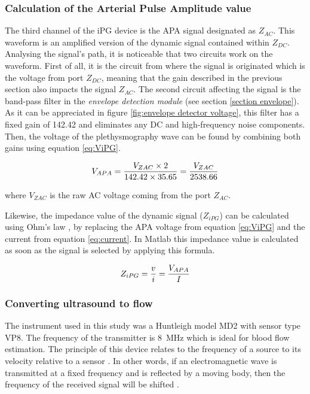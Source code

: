 \subsubsection{Calculation of the Arterial Pulse Amplitude value}
The third channel of the iPG device is the APA signal designated as $Z_{AC}$. This waveform is an amplified version of the dynamic signal contained within $Z_{DC}$. Analysing the signal's path, it is noticeable that two circuits work on the waveform. First of all, it is the circuit from where the signal is originated which is the voltage from port $Z_{DC}$, meaning that the gain described in the previous section also impacts the signal $Z_{AC}$. The second circuit affecting the signal is the band-pass filter in the \textit{envelope detection module} (see section \ref{section envelope}). As it can be appreciated in figure \ref{fig:envelope detector voltage}, this filter has a fixed gain of \num{142.42} and eliminates any DC and high-frequency noise components. Then, the voltage of the plethysmography wave can be found by combining both gains using equation \ref{eq:ViPG}.

\begin{align}
	\label{eq:ViPG}
	V_{APA} = \frac{V_{ZAC} \times 2}{142.42 \times 35.65}=\frac{V_{ZAC}}{2538.66} \tagaddtext{[\si{\volt}]}
\end{align}

where $V_{ZAC}$ is the raw AC voltage coming from the port $Z_{AC}$.

Likewise, the impedance value of the dynamic signal ($Z_{iPG}$) can be calculated using Ohm's law \cite{ohm1827galvanische}, by replacing the APA voltage from equation \ref{eq:ViPG} and the current from equation \ref{eq:current}. In Matlab this impedance value is calculated as soon as the signal is selected by applying this formula.

\begin{align}
	\label{eq:zipg}
	Z_{iPG}=\frac{v}{i} = \frac{V_{APA}}{I} \tagaddtext{[\si{\ohm}]}
\end{align}

\subsubsection{Converting ultrasound to flow}
\label{sectionDU}
The instrument used in this study was a Huntleigh model MD2 with sensor type VP8. The frequency of the transmitter is \SI{8}{\mega\hertz} which is ideal for blood flow estimation. The principle of this device relates to the frequency of a source to its velocity relative to a sensor \cite{surgeonhand2002Hand}. In other words, if an electromagnetic wave is transmitted at a fixed frequency and is reflected by a moving body, then the frequency of the received signal will be shifted \cite{ht:MD2}.  

